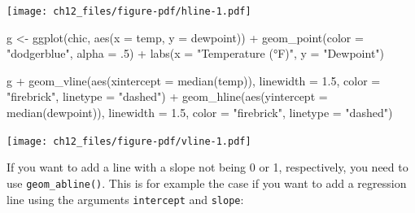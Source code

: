 \documentclass[
  letterpaper,
]{scrbook}
\newenvironment{Shaded}{\begin{snugshade}}{\end{snugshade}}
\newcommand{\AttributeTok}[1]{\textcolor[rgb]{0.40,0.45,0.13}{#1}}
\newcommand{\DecValTok}[1]{\textcolor[rgb]{0.68,0.00,0.00}{#1}}
\newcommand{\FloatTok}[1]{\textcolor[rgb]{0.68,0.00,0.00}{#1}}
\newcommand{\FunctionTok}[1]{\textcolor[rgb]{0.28,0.35,0.67}{#1}}
\newcommand{\NormalTok}[1]{\textcolor[rgb]{0.00,0.23,0.31}{#1}}
\newcommand{\OtherTok}[1]{\textcolor[rgb]{0.00,0.23,0.31}{#1}}
\newcommand{\SpecialCharTok}[1]{\textcolor[rgb]{0.37,0.37,0.37}{#1}}
\newcommand{\StringTok}[1]{\textcolor[rgb]{0.13,0.47,0.30}{#1}}
\begin{document}
\texttt{[image: ch12\_files/figure-pdf/hline-1.pdf]}

\begin{Shaded}
\begin{Highlighting}[]
\NormalTok{g }\OtherTok{\textless{}{-}} \FunctionTok{ggplot}\NormalTok{(chic, }\FunctionTok{aes}\NormalTok{(}\AttributeTok{x =}\NormalTok{ temp, }\AttributeTok{y =}\NormalTok{ dewpoint)) }\SpecialCharTok{+}
  \FunctionTok{geom\_point}\NormalTok{(}\AttributeTok{color =} \StringTok{"dodgerblue"}\NormalTok{, }\AttributeTok{alpha =}\NormalTok{ .}\DecValTok{5}\NormalTok{) }\SpecialCharTok{+}
  \FunctionTok{labs}\NormalTok{(}\AttributeTok{x =} \StringTok{"Temperature (°F)"}\NormalTok{, }\AttributeTok{y =} \StringTok{"Dewpoint"}\NormalTok{)}

\NormalTok{g }\SpecialCharTok{+}
  \FunctionTok{geom\_vline}\NormalTok{(}\FunctionTok{aes}\NormalTok{(}\AttributeTok{xintercept =} \FunctionTok{median}\NormalTok{(temp)), }\AttributeTok{linewidth =} \FloatTok{1.5}\NormalTok{,}
             \AttributeTok{color =} \StringTok{"firebrick"}\NormalTok{, }\AttributeTok{linetype =} \StringTok{"dashed"}\NormalTok{) }\SpecialCharTok{+}
  \FunctionTok{geom\_hline}\NormalTok{(}\FunctionTok{aes}\NormalTok{(}\AttributeTok{yintercept =} \FunctionTok{median}\NormalTok{(dewpoint)), }\AttributeTok{linewidth =} \FloatTok{1.5}\NormalTok{,}
             \AttributeTok{color =} \StringTok{"firebrick"}\NormalTok{, }\AttributeTok{linetype =} \StringTok{"dashed"}\NormalTok{)}
\end{Highlighting}
\end{Shaded}

\texttt{[image: ch12\_files/figure-pdf/vline-1.pdf]}

If you want to add a line with a slope not being 0 or 1, respectively,
you need to use \texttt{geom\_abline()}. This is for example the case if
you want to add a regression line using the arguments \texttt{intercept}
and \texttt{slope}:
\end{document}
